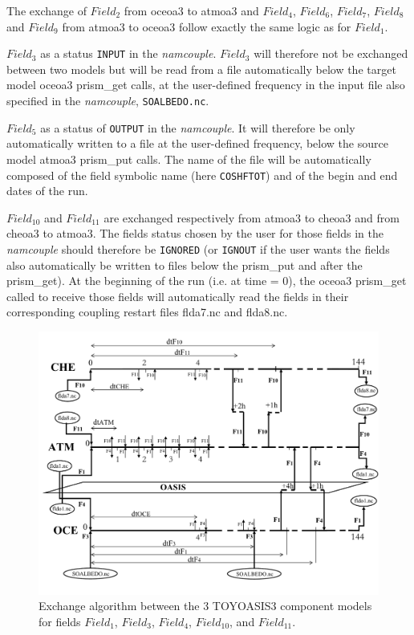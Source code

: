 The exchange of $Field_2$ from oceoa3 to atmoa3 and $Field_4$, $Field_6$,
$Field_7$, $Field_8$ and $Field_9$ from atmoa3 to oceoa3 follow exactly the
same logic as for $Field_1$.

$Field_3$ as a status \texttt{INPUT} in the {\it namcouple}. $Field_3$
will therefore not be exchanged between two models but will be read
from a file automatically below the target model oceoa3 prism\_get
calls, at the user-defined frequency in the input file also specified
in the {\it namcouple}, \texttt{SOALBEDO.nc}.

$Field_5$ as a status of \texttt{OUTPUT} in the {\it namcouple}. It
will therefore be only automatically written to a file at the
user-defined frequency, below the source model atmoa3 prism\_put calls.  The
name of the file will be automatically composed of the field symbolic
name (here \texttt{COSHFTOT}) and of the begin and end dates of the
run. 

$Field_{10}$ and $Field_{11}$ are exchanged respectively from atmoa3 to
cheoa3 and from cheoa3 to atmoa3. The
fields status chosen by the user for those fields in the 
{\it namcouple} should therefore be \texttt{IGNORED} (or \texttt{IGNOUT} if
the user wants the fields also automatically be written to files below
the prism\_put and after the prism\_get). At the beginning of the run
(i.e. at time = 0), the oceoa3 prism\_get called to receive those
fields will automatically read the fields in their corresponding
coupling restart files flda7.nc and flda8.nc.

\vspace*{1ex}
\begin{figure}[htbp]
\includegraphics[scale=0.57]{figures/coupling_algo4}
\caption{Exchange algorithm between the 3 TOYOASIS3 component models for
  fields $Field_1$, $Field_3$,
$Field_4$, $Field_{10}$, and $Field_{11}$. }
\label{fig:toyoasis3couplingalgo}
\end{figure}



